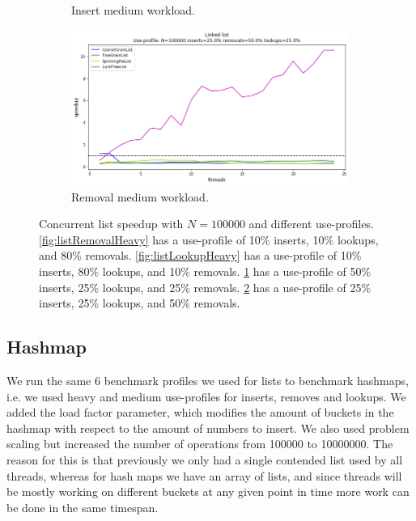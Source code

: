 \documentclass[11pt]{article}
\begin{document}
\begin{figure}[h]
\begin{subfigure}{.5\textwidth}
  \caption{Insert medium workload.}
  \label{fig:listInsertMedium}
\end{subfigure}%
\hspace*{\fill}
\begin{subfigure}{.5\textwidth}
  \centering
  \includegraphics[width=1\linewidth]{figs/lateday/combined/lateday_combined_list_insert_25_lookup_25_removal_50}
  \caption{Removal medium workload.}
  \label{fig:listRemovalMedium}
\end{subfigure}
\caption{
Concurrent list speedup with $N=100000$ and different use-profiles.
\ref{fig:listRemovalHeavy} has a use-profile of 10\% inserts, 10\% lookups, and
80\% removals. \ref{fig:listLookupHeavy} has a use-profile of 10\% inserts, 80\%
lookups, and 10\% removals. \ref{fig:listInsertMedium} has a use-profile of 50\%
inserts, 25\% lookups, and 25\% removals. \ref{fig:listRemovalMedium} has a
use-profile of 25\% inserts, 25\% lookups, and 50\% removals.
}
\label{fig:manyLists}
\end{figure}

\subsection{Hashmap}
We run the same 6 benchmark profiles we used for
lists to benchmark hashmaps, i.e. we used heavy and medium use-profiles for inserts,
removes and lookups. We added the load factor parameter, which modifies the
amount of buckets in the hashmap with respect to the amount of
numbers to insert. We also used problem scaling but increased the number of
operations from 100000 to 10000000. The reason for this is that previously we
only had a single contended list used by all threads, whereas for hash maps we
have an array of lists, and since threads will be mostly working on
different buckets at any given point in time more work can be done in the same
timespan.
\end{document}
